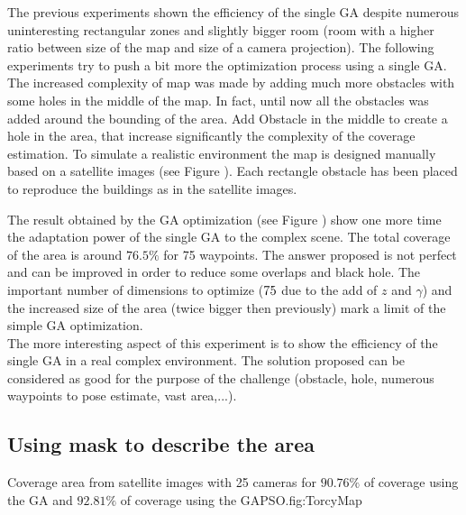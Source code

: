 The previous experiments shown the efficiency of the single GA despite numerous uninteresting rectangular zones and slightly bigger room (room with a higher ratio between size of the map and size of a camera projection). The following experiments try to push a bit more the optimization process using a single GA. The increased complexity of map was made by adding much more obstacles with some holes in the middle of the map. In fact, until now all the obstacles was added around the bounding of the area. Add Obstacle in the middle to create a hole in the area, that increase significantly the complexity of the coverage estimation.
To simulate a realistic environment the map is designed manually based on a satellite images (see Figure ). Each rectangle obstacle has been placed to reproduce the buildings as in  the satellite images. 

The result obtained by the GA optimization (see Figure ) show one more time the adaptation power of the single GA to the complex scene. The total coverage of the area is around $76.5\%$ for 75 waypoints. The answer proposed is not perfect and can be improved in order to reduce some overlaps and black hole. The important number of dimensions to optimize ($75\time 4$ due to the add of $z$ and  $\gamma$) and the increased size of the area (twice bigger then previously) mark a limit of the simple GA optimization.\\
	The more interesting aspect of this experiment is to show the efficiency of the single GA in a real complex environment. The solution proposed can be considered as good for the purpose of the challenge (obstacle, hole, numerous waypoints to pose estimate, vast area,...). 
  

	
	\subsection{Using mask to describe the area }\label{sec:maskGAPSO}

\begin{mfigures}[!]
{Coverage area from satellite images with 25 cameras for $90.76\%$ of coverage using the GA and $92.81\%$ of coverage using the GAPSO.}{fig:TorcyMap} \centering
{}
\hspace{1cm}
\hspace{1cm}
\tabsimuposeTorcy
\end{mfigures}


